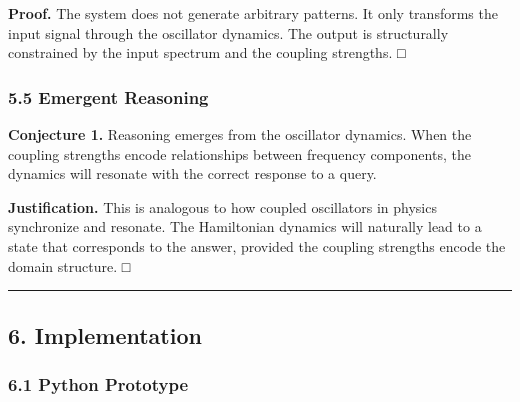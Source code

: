 \documentclass[
  11pt,
  a4paper,
]{article}
\begin{document}
\textbf{Proof.} The system does not generate arbitrary patterns. It only
transforms the input signal through the oscillator dynamics. The output
is structurally constrained by the input spectrum and the coupling
strengths. □

\subsubsection{5.5 Emergent Reasoning}\label{emergent-reasoning}

\textbf{Conjecture 1.} Reasoning emerges from the oscillator dynamics.
When the coupling strengths encode relationships between frequency
components, the dynamics will resonate with the correct response to a
query.

\textbf{Justification.} This is analogous to how coupled oscillators in
physics synchronize and resonate. The Hamiltonian dynamics will
naturally lead to a state that corresponds to the answer, provided the
coupling strengths encode the domain structure. □

\begin{center}\rule{0.5\linewidth}{0.5pt}\end{center}

\subsection{6. Implementation}\label{implementation}

\subsubsection{6.1 Python Prototype}\label{python-prototype}
\end{document}
